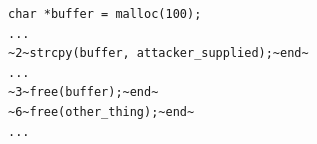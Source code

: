 \documentclass[tikz]{standalone}
\begin{document}
\begin{lrbox}{\heapSmashVulnCode}
\begin{lstlisting}
char *buffer = malloc(100);
... 
~2~strcpy(buffer, attacker_supplied);~end~
... 
~3~free(buffer);~end~
~6~free(other_thing);~end~
...
\end{lstlisting}
\end{lrbox}









\end{document}
